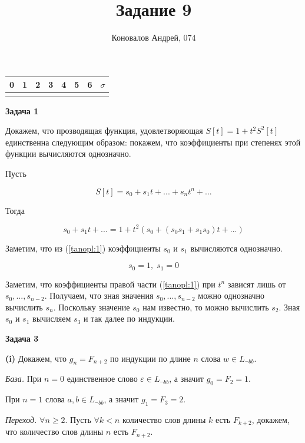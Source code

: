 \documentclass[10pt]{article}
\title{Задание 9}
\author{Коновалов Андрей, 074}
\date{}
\let \eps \varepsilon
\begin{document}
\maketitle

\noindent
\begin{tabularx}{\textwidth}{|C|C|C|C|C|C|C|C|}
   & 1 & 2 & 3 & 4 & 5 & 6 & $\sigma$ \\
  \hline
  &&&&&&& \\
  \hline
\end{tabularx}

\bigskip

{\bf Задача 1}

Докажем, что прозводящая функция, удовлетворяющая $S[t] = 1 + t^2 S^2 [t]$ единственна следующим образом: покажем, что коэффициенты при степенях этой функции вычисляются однозначно.

Пусть

$$
  S[t] = s_0 + s_1 t + ... + s_n t^n + ...
$$

Тогда

\begin{equation}
  \label{tanopl:1}
  s_0 + s_1 t + ... = 1 + t^2 (s_0 + (s_0 s_1 + s_1 s_0) t + ...)
\end{equation}

Заметим, что из (\ref{tanopl:1}) коэффициенты $s_0$ и $s_1$ вычисляются однозначно.

$$
  s_0 = 1, \; s_1 = 0
$$

Заметим, что коэффициенты правой части (\ref{tanopl:1}) при $t^n$ зависят лишь от $s_0, ..., s_{n - 2}$. Получаем, что зная значения $s_0, ..., s_{n - 2}$ можно однозначно вычислить $s_n$. Поскольку значение $s_0$ нам известно, то можно вычислить $s_2$. Зная $s_0$ и $s_1$ вычисляем $s_3$ и так далее по индукции.

\medskip

{\bf Задача 3}

{\bf (i)}
Докажем, что $g_n = F_{n + 2}$ по индукции по длине $n$ слова $w \in L_{\neg bb}$.

\smallskip

{\it База.}
При $n = 0$ единственное слово $\eps \in L_{\neg bb}$, а значит $g_0 = F_2 = 1$.

При $n = 1$ слова $a, b \in L_{\neg bb}$, а значит $g_1 = F_3 = 2$.

\smallskip

{\it Переход.}
$\forall n \geq 2$.
Пусть $\forall k < n$ количество слов длины $k$ есть $F_{k + 2}$, докажем, что количество слов длины $n$ есть $F_{n + 2}$.
\end{document}
